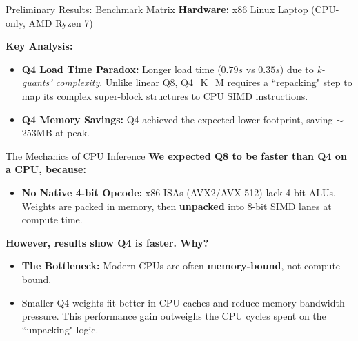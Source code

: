 \documentclass[10pt]{beamer}
\begin{document}
\begin{frame}{Preliminary Results: Benchmark Matrix}
    \textbf{Hardware:} x86 Linux Laptop (CPU-only, AMD Ryzen 7)
    \begin{table}[]
    \centering
    \caption{Llama 3.1-8B on x86\_Arch\_Linux\_Laptop}
    \end{table}

    \textbf{Key Analysis:}
    \begin{itemize}
        \item \textbf{Q4 Load Time Paradox:} Longer load time ($0.79s$ vs $0.35s$) due to \emph{k-quants' complexity}. Unlike linear Q8, Q4\_K\_M requires a ``repacking" step to map its complex super-block structures to CPU SIMD instructions.
        \item \textbf{Q4 Memory Savings:} Q4 achieved the expected lower footprint, saving $\sim$253MB at peak.
    \end{itemize}
\end{frame}

\begin{frame}{The Mechanics of CPU Inference}
    \textbf{We expected Q8 to be faster than Q4 on a CPU, because:}
    \begin{itemize}
        \item \textbf{No Native 4-bit Opcode:} x86 ISAs (AVX2/AVX-512) lack 4-bit ALUs. Weights are packed in memory, then \textbf{unpacked} into 8-bit SIMD lanes at compute time.
    \end{itemize}
    \textbf{However, results show Q4 is faster. Why?}
    \begin{itemize}
        \item \textbf{The Bottleneck:} Modern CPUs are often \textbf{memory-bound}, not compute-bound.
        \item Smaller Q4 weights fit better in CPU caches and reduce memory bandwidth pressure. This performance gain outweighs the CPU cycles spent on the ``unpacking" logic.
    \end{itemize}
\end{frame}
\end{document}
